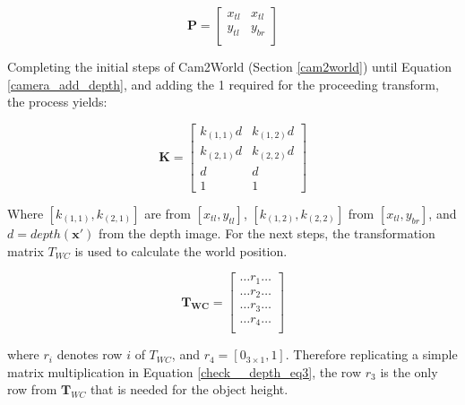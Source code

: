 \documentclass[11pt,twoside]{report}
\begin{document}
\begin{equation}
\mathbf{P} = 
\begin{bmatrix}
x_{tl} & x_{tl}\\
y_{tl} & y_{br} \\
\end{bmatrix}
\label{check__depth_eq1}
\end{equation}

Completing the initial steps of Cam2World (Section \ref{cam2world}) until Equation \ref{camera_add_depth}, and adding the 1 required for the proceeding transform, the process yields:

\begin{equation}
\mathbf{K} = 
\begin{bmatrix}
k_{(1,1)}\mathit{d} & k_{(1,2)}\mathit{d}\\
k_{(2,1)}\mathit{d} & k_{(2,2)}\mathit{d}\\
\mathit{d} & \mathit{d}\\
1 & 1
\end{bmatrix}
\label{check__depth_eq2}
\end{equation}

Where $[k_{(1,1)},k_{(2,1)}]$ are from $[x_{tl},y_{tl}]$, $[k_{(1,2)}, k_{(2,2)}]$  from $[x_{tl},y_{br}]$, and $\mathit{d} = depth(\mathbf{x'})$ from the depth image. For the next steps, the transformation matrix $T_{WC}$ is used to calculate the world position.

\begin{equation}
\mathbf{T_{WC}} = 
\begin{bmatrix}
\dots r_{1} \dots \\
\dots r_{2} \dots \\
\dots r_{3} \dots \\
\dots r_{4} \dots \\
\end{bmatrix}
\label{check__depth_eq2}
\end{equation}

where $r_{i}$ denotes row $i$ of $T_{WC}$, and $r_{4} =[0_{3 \times 1},1]$. Therefore replicating a simple matrix multiplication in Equation \ref{check__depth_eq3}, the row $r_{3}$ is the only row from $\mathbf{T}_{WC}$ that is needed for the object height.
\end{document}
